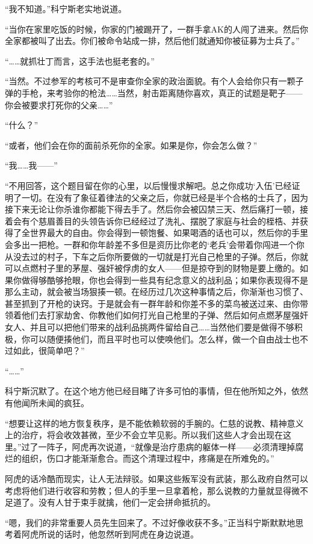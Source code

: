 “我不知道。”科宁斯老实地说道。

“当你在家里吃饭的时候，你家的门被踢开了，一群手拿AK的人闯了进来。然后你全家都被叫了出去。你们被命令站成一排，然后他们就通知你被征募为士兵了。”

“……就抓壮丁而言，这手法也挺老套的。”

“当然。不过参军的考核可不是审查你全家的政治面貌。有个人会给你只有一颗子弹的手枪，来考验你的枪法……当然，射击距离随你喜欢，真正的试题是靶子——你会被要求打死你的父亲……”

“什么？”

“或者，他们会在你的面前杀死你的全家。如果是你，你会怎么做？”

“我……我——”

“不用回答，这个题目留在你的心里，以后慢慢求解吧。总之你成功‘入伍’已经证明了一切。在没有了象征着律法的父亲之后，你就已经是半个合格的士兵了，因为接下来无论让你杀谁你都能下得去手了。然后你会被囚禁三天、然后痛打一顿，接着会有个慈眉善目的头领告诉你已经经过了洗礼、摆脱了家庭与社会的桎梏、并获得了全世界最大的自由。你会得到一顿饱餐、如果喝酒的话也可以，然后你的手里会多出一把枪。一群和你年龄差不多但是资历比你老的‘老兵’会带着你闯进一个你从没去过的村子，下车之后你所要做的一切就是打光自己枪里的子弹。然后，你就可以点燃村子里的茅屋、强奸被俘虏的女人——但是掠夺到的财物是要上缴的。如果你做得够酷够抢眼，你也会得到一些具有纪念意义的战利品；如果你表现得不是那么主动，就会被当场狠揍一顿。在经历过几次这种事情之后，你渐渐也习惯了、甚至抓到了开枪的诀窍。于是就会有一群年龄和你差不多的菜鸟被送过来、由你带领着他们去打家劫舍、你教他们如何打光自己枪里的子弹、然后如何点燃茅屋强奸女人、并且可以把他们带来的战利品挑两件留给自己……当然他们要是做得不够积极，你可以随便揍他们，而且平时也可以使唤他们。怎么样，做一个自由战士也不过如此，很简单吧？”

“……”

科宁斯沉默了。在这个地方他已经目睹了许多可怕的事情，但在他所知之外，依然有他闻所未闻的疯狂。

“想要让这样的地方恢复秩序，是不能依赖软弱的手腕的。仁慈的说教、精神意义上的治疗，将会收效甚微，至少不会立竿见影。所以我们这些人才会出现在这里。”过了一阵子，阿虎再次说道，“就像是治疗患病的躯体一样——必须清理掉腐烂的组织，伤口才能渐渐愈合。而这个清理过程中，疼痛是在所难免的。”

阿虎的话冷酷而现实，让人无法辩驳。如果这些叛军没有武装，那么政府自然可以考虑将他们进行收容和劳教；但人的手里一旦拿着枪，那么说教的力量就显得微不足道了。没有人甘于束手就擒，他们一定会拼命抵抗的。

“嗯，我们的非常重要人员先生回来了。不过好像收获不多。”正当科宁斯默默地思考着阿虎所说的话时，他忽然听到阿虎在身边说道。

